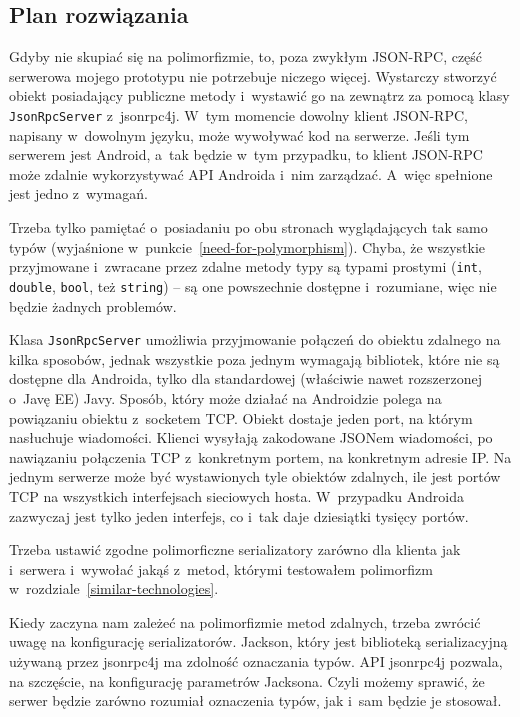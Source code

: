 \subsection{Plan rozwiązania}
Gdyby nie skupiać się na polimorfizmie, to, poza zwykłym JSON-RPC, część serwerowa mojego prototypu nie potrzebuje niczego więcej.
Wystarczy stworzyć obiekt posiadający publiczne metody i~wystawić go na zewnątrz za pomocą klasy \texttt{JsonRpcServer} z~jsonrpc4j.
W~tym momencie dowolny klient JSON-RPC, napisany w~dowolnym języku, może wywoływać kod na serwerze.
Jeśli tym serwerem jest Android, a~tak będzie w~tym przypadku, to klient JSON-RPC może zdalnie wykorzystywać API Androida i~nim zarządzać. A~więc spełnione jest jedno z~wymagań.

Trzeba tylko pamiętać o~posiadaniu po obu stronach wyglądających tak samo typów (wyjaśnione w~punkcie~\ref{need-for-polymorphism}).
Chyba, że wszystkie przyjmowane i~zwracane przez zdalne metody typy są typami prostymi (\texttt{int}, \texttt{double}, \texttt{bool}, też \texttt{string}) -- są one powszechnie dostępne i~rozumiane, więc nie będzie żadnych problemów.

Klasa \texttt{JsonRpcServer} umożliwia przyjmowanie połączeń do obiektu zdalnego na kilka sposobów, jednak wszystkie poza jednym wymagają bibliotek, które nie są dostępne dla Androida, tylko dla standardowej (właściwie nawet rozszerzonej o~Javę EE) Javy.
Sposób, który może działać na Androidzie polega na powiązaniu obiektu z~socketem TCP. Obiekt dostaje jeden port, na którym nasłuchuje wiadomości.
Klienci wysyłają zakodowane JSONem wiadomości, po nawiązaniu połączenia TCP z~konkretnym portem, na konkretnym adresie IP.
Na jednym serwerze może być wystawionych tyle obiektów zdalnych, ile jest portów TCP na wszystkich interfejsach sieciowych hosta.
W~przypadku Androida zazwyczaj jest tylko jeden interfejs, co i~tak daje dziesiątki tysięcy portów.

Trzeba ustawić zgodne polimorficzne serializatory zarówno dla klienta jak i~serwera i~wywołać jakąś z~metod, którymi testowałem polimorfizm w~rozdziale~\ref{similar-technologies}.

Kiedy zaczyna nam zależeć na polimorfizmie metod zdalnych, trzeba zwrócić uwagę na konfigurację serializatorów.
Jackson, który jest biblioteką serializacyjną używaną przez jsonrpc4j ma zdolność oznaczania typów. API jsonrpc4j pozwala, na szczęście, na konfigurację parametrów Jacksona. Czyli możemy sprawić, że serwer będzie zarówno rozumiał oznaczenia typów, jak i~sam będzie je stosował.

